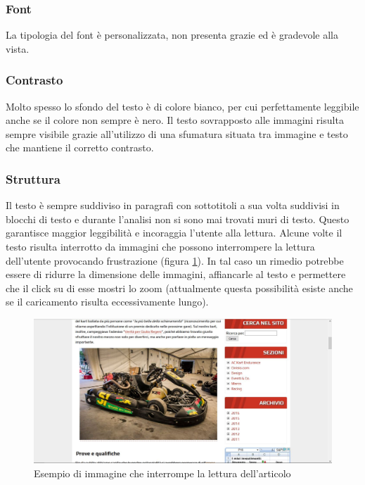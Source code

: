 		\subsubsection{Font}
			La tipologia del font è personalizzata, non presenta grazie ed è gradevole alla vista.
			
		\subsubsection{Contrasto}
			Molto spesso lo sfondo del testo è di colore bianco, per cui perfettamente leggibile anche se il colore non sempre è nero. Il testo sovrapposto alle immagini risulta sempre visibile grazie all'utilizzo di una sfumatura situata tra immagine e testo che mantiene il corretto contrasto.
			
		\subsubsection{Struttura}
			Il testo è sempre suddiviso in paragrafi con sottotitoli a sua volta suddivisi in blocchi di testo e durante l'analisi non si sono mai trovati muri di testo. Questo garantisce maggior leggibilità e incoraggia l'utente alla lettura. Alcune volte il testo risulta interrotto da immagini che possono interrompere la lettura dell'utente provocando frustrazione (figura \ref{fig:ImageBetweenText}). In tal caso un rimedio potrebbe essere di ridurre la dimensione delle immagini, affiancarle al testo e permettere che il click su di esse mostri lo zoom (attualmente questa possibilità esiste anche se il caricamento risulta eccessivamente lungo).
			
			\begin{figure} [h]
				\includegraphics[width=\textwidth]{images/ImageBetweenText}
				\caption{Esempio di immagine che interrompe la lettura dell'articolo}
				\label{fig:ImageBetweenText}
			\end{figure}
			
